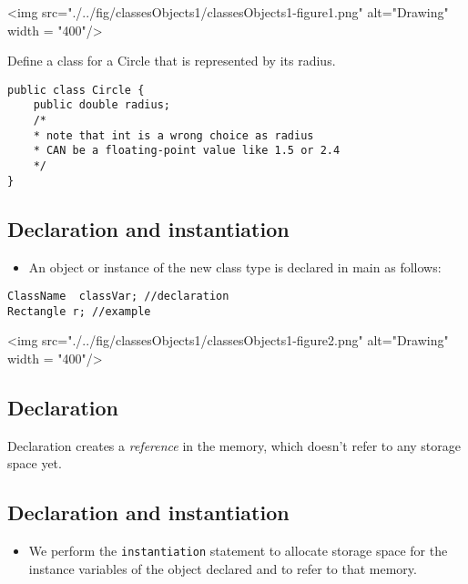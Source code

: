 \vskip 0.1cm
\begin{center}
	<img src="./../fig/classesObjects1/classesObjects1-figure1.png" alt="Drawing" width = "400"/> 				
\end{center}
\vskip 0.1cm

\begin{exercise}
Define a class for a Circle that is represented by its radius.
\end{exercise}
\begin{answer} \begin{lstlisting}
public class Circle {
	public double radius;
	/*
	* note that int is a wrong choice as radius 
	* CAN be a floating-point value like 1.5 or 2.4
	*/
}
\end{lstlisting} \end{answer}

\subsection{Declaration and instantiation}

  \begin{itemize}
  \item An object or instance of the new class type is declared in main as follows:
        \end{itemize}
\begin{lstlisting}
ClassName  classVar; //declaration
Rectangle r; //example
\end{lstlisting}
	
\vskip 0.5cm
\begin{center}
<img src="./../fig/classesObjects1/classesObjects1-figure2.png" alt="Drawing" width = "400"/> 
\end{center}

\subsection{Declaration}

Declaration creates a \emph{reference} in the memory, which doesn't refer to any storage space yet. 

\subsection{Declaration and instantiation}

\begin{itemize}
\item We perform the \lstinline!instantiation! statement to allocate storage space for the instance variables of the object declared and to refer to that memory.
\end{itemize}
  

